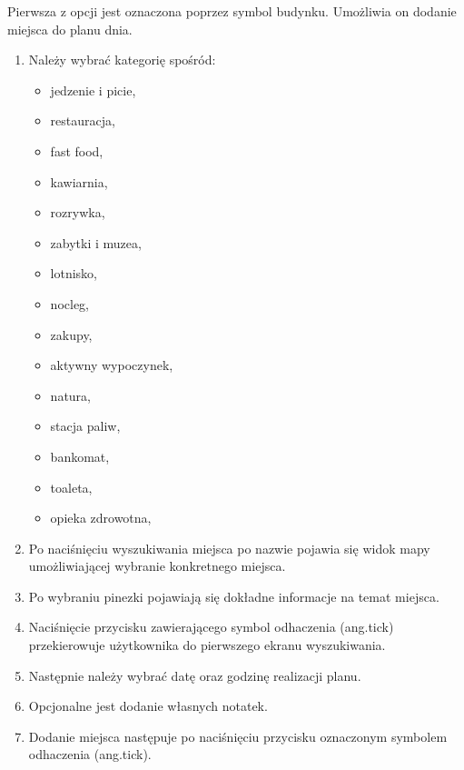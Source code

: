 \documentclass[10pt,twoside,a4paper]{report}
\begin{document}
\par Pierwsza z opcji jest oznaczona poprzez symbol budynku.
Umożliwia on dodanie miejsca do planu dnia.

\begin{enumerate}
\item Należy wybrać kategorię spośród:
\begin{itemize}
\item jedzenie i picie,
\item restauracja,
\item fast food,
\item kawiarnia,
\item rozrywka,
\item zabytki i muzea,
\item lotnisko,
\item nocleg,
\item zakupy,
\item aktywny wypoczynek,
\item natura,
\item stacja paliw,
\item bankomat,
\item toaleta,
\item opieka zdrowotna,
\end{itemize}
\item Po naciśnięciu wyszukiwania miejsca po nazwie pojawia się widok mapy umożliwiającej wybranie konkretnego miejsca.
\item Po wybraniu pinezki pojawiają się dokładne informacje na temat miejsca.
\item Naciśnięcie przycisku zawierającego symbol odhaczenia (ang.tick) przekierowuje użytkownika do pierwszego ekranu wyszukiwania.
\item Następnie należy wybrać datę oraz godzinę realizacji planu.
\item Opcjonalne jest dodanie własnych notatek.
\item Dodanie miejsca następuje po naciśnięciu przycisku oznaczonym symbolem odhaczenia (ang.tick).
\end{enumerate}
\end{document}

